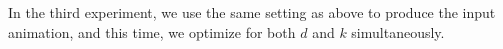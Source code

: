 \documentclass[twocolumn,a4paper]{article}
\begin{document}
In the third experiment, we use the same setting as above to produce the input
animation, and this time, we optimize for both $d$ and $k$ simultaneously.

\end{document}

